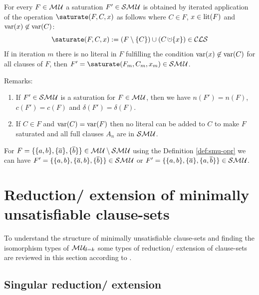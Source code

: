 \documentclass{report}
\begin{document}
\begin{defi}\label{def:smu-opr}
\cite{h29} For every $F \in \mathcal{M\hspace{0.8pt}U}$ a saturation $F' \in \mathcal{S}\mathcal{M\hspace{0.8pt}U}$ is obtained by iterated application of the operation $\saturate(F,C,x)$ as follows where $C \in F$, $x \in \operatorname{lit}(F)$ and $\operatorname{var}(x) \not \in \operatorname{var}(C)$:
  \begin{displaymath}
    \saturate(F,C,x) := (F \sm \set{C}) \cup (C \addcup \set{x}) \in \Cls
  \end{displaymath}
If in iteration $m$ there is no literal in $F$ fulfilling the condition $\operatorname{var}(x) \not \in \operatorname{var}(C)$ for all clauses of $F$, then $F' =\saturate(F_m,C_m,x_m) \in \Smusat$. 
\end{defi}
Remarks:
  \begin{enumerate}
  \item If $F' \in \mathcal{S}\mathcal{M\hspace{0.8pt}U}$ is a saturation for $F \in \mathcal{M\hspace{0.8pt}U}$, then we have $n(F')=n(F)$, $c(F')=c(F)$ and $\delta(F')=\delta(F)$.
  \item If $C \in F$ and $\operatorname{var}(C) = \operatorname{var}(F)$ then no literal can be added to $C$ to make $F$ saturated and all full clauses $A_n$ are in $\mathcal{S}\mathcal{M\hspace{0.8pt}U}$.
  \end{enumerate} 
  
\begin{examp}\label{exp:smu-exp}
  For $F = \{ \{ a,b \},\{ \overline{a} \},\{ \overline{b} \} \} \in \mathcal{M\hspace{0.8pt}U} \setminus \mathcal{S}\mathcal{M\hspace{0.8pt}U}$ using the Definition \ref{def:smu-opr} we can have $F'=\{ \{ a,b \},\{ \overline{a},b \},\{ \overline{b} \} \} \in \mathcal{S}\mathcal{M\hspace{0.8pt}U}$ or $F'=\{ \{ a,b \},\{ \overline{a} \},\{ a,\overline{b} \} \} \in \mathcal{S}\mathcal{M\hspace{0.8pt}U}$.
\end{examp}
\section{Reduction/ extension of minimally unsatisfiable clause-sets}
\label{sec:r-e}

To understand the structure of minimally unsatisfiable clause-sets and finding the isomorphism types of $\mathcal{M\hspace{0.8pt}U}_{\!\delta=k}$ some types of reduction/ extension of clause-sets are reviewed in this section according to \cite{h9,h29}.

\subsection{Singular reduction/ extension}
\label{sec:sing-re} 
\end{document}
